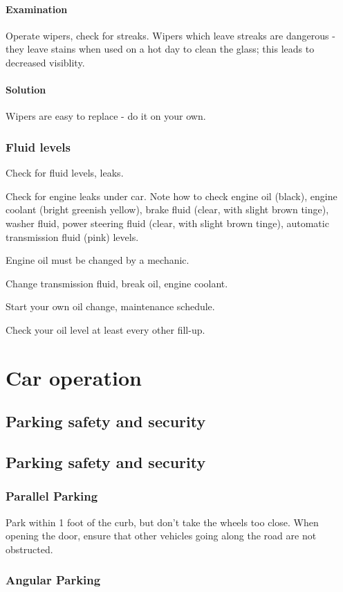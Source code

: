 \documentclass[oneside, article]{memoir}
\begin{document}
\subsection{Examination}
Operate wipers, check for streaks. Wipers which leave streaks are dangerous - they leave stains when used on a hot day to clean the glass; this leads to decreased visiblity.

\subsection{Solution}
Wipers are easy to replace - do it on your own.

\section{Fluid levels}
Check for fluid levels, leaks.

Check for engine leaks under car. Note how to check engine oil (black), engine coolant (bright greenish yellow), brake fluid (clear, with slight brown tinge), washer fluid, power steering fluid (clear, with slight brown tinge), automatic transmission fluid (pink) levels.

Engine oil must be changed by a mechanic.

Change transmission fluid, break oil, engine coolant.

Start your own oil change, maintenance schedule.

Check your oil level at least every other fill-up.

\part{Car operation}
\chapter{Parking safety and security}
\chapter{Parking safety and security}
\section{Parallel Parking}
Park within 1 foot of the curb, but don't take the wheels too close. When opening the door, ensure that other vehicles going along the road are not obstructed.

\section{Angular Parking}
\end{document}
